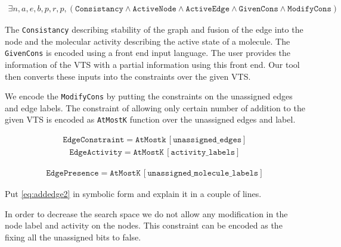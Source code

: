 \begin{align}
  \exists n, a, e, b, p, r, p,
  ( \texttt{Consistancy}\land \texttt{ActiveNode} \land 
  \texttt{ActiveEdge} \land \texttt{GivenCons} \land
  \texttt{ModifyCons} )   
  \tag{E1}\label{eq:addedge1}
\end{align}



The \texttt{Consistancy} describing stability of the graph and fusion of the
edge into the node and the molecular activity describing the active
state of a molecule. The \texttt{GivenCons} is encoded using a front
end input language. The user provides the information of the VTS with
a partial information using this front end. Our tool then converts
these inputs into the constraints over the given VTS. 

We encode the \texttt{ModifyCons} by putting the constraints on the unassigned edges and edge labels. The constraint of allowing only certain number of addition to the given VTS is encoded as \texttt{AtMostK} function over the unassigned edges and label.

\begin{align}
   \texttt{EdgeConstraint} = \texttt{AtMostk} \, [ \texttt{unassigned\_edges} ]  
   \tag{E2}\label{eq:addedge2}
\end{align}
\begin{align}
   \texttt{EdgeActivity} = \texttt{AtMostK} \, [ \texttt{activity\_labels} ]
   \tag{E3}\label{eq:addedge3}
\end{align}

\begin{align}
   \texttt{EdgePresence} = \texttt{AtMostK} \, [ \texttt{unassigned\_molecule\_labels} ]  
   \tag{E4}\label{eq:addedge4}
\end{align}



Put \ref{eq:addedge2} in symbolic form and explain it in a couple of lines.

In order to decrease the search space we do not allow any modification in the node label and activity on the nodes. This constraint can be encoded as the fixing all the unassigned bits to false. 
    
